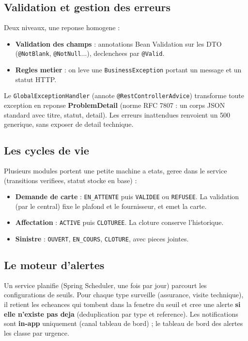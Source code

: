 \documentclass[11pt]{article}
\begin{document}
\subsection{Validation et gestion des erreurs}
Deux niveaux, une reponse homogene :
\begin{itemize}
  \item \textbf{Validation des champs} : annotations Bean Validation sur les DTO (\texttt{@NotBlank},
        \texttt{@NotNull}...), declenchees par \texttt{@Valid}.
  \item \textbf{Regles metier} : on leve une \texttt{BusinessException} portant un message et un statut HTTP.
\end{itemize}
Le \texttt{GlobalExceptionHandler} (annote \texttt{@RestControllerAdvice}) transforme toute exception en
reponse \textbf{ProblemDetail} (norme RFC 7807 : un corps JSON standard avec titre, statut, detail). Les
erreurs inattendues renvoient un 500 generique, sans exposer de detail technique.

\subsection{Les cycles de vie}
Plusieurs modules portent une petite machine a etats, geree dans le service (transitions verifiees,
statut stocke en base) :
\begin{itemize}
  \item \textbf{Demande de carte} : \texttt{EN\_ATTENTE} puis \texttt{VALIDEE} ou \texttt{REFUSEE}. La
        validation (par le central) fixe le plafond et le fournisseur, et emet la carte.
  \item \textbf{Affectation} : \texttt{ACTIVE} puis \texttt{CLOTUREE}. La cloture conserve l'historique.
  \item \textbf{Sinistre} : \texttt{OUVERT}, \texttt{EN\_COURS}, \texttt{CLOTURE}, avec pieces jointes.
\end{itemize}

\subsection{Le moteur d'alertes}
Un service planifie (Spring Scheduler, une fois par jour) parcourt les configurations de seuils. Pour
chaque type surveille (assurance, visite technique), il retient les echeances qui tombent dans la
fenetre du seuil et cree une alerte \textbf{si elle n'existe pas deja} (deduplication par type et
reference). Les notifications sont \textbf{in-app} uniquement (canal tableau de bord) ; le tableau de
bord des alertes les classe par urgence.
\end{document}
